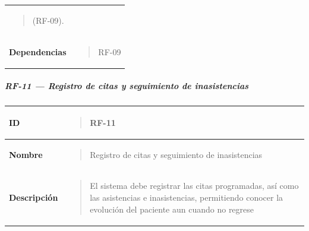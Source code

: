 \documentclass[
]{article}
\newcounter{none} %
\begin{document}
{\begin{longtable}[]{@{}
  >{\raggedright\arraybackslash}p{}
  >{\raggedright\arraybackslash}p{}@{}}
\begin{minipage}[t]{\linewidth}
\begin{quote}
(RF-09).
\end{quote}
\end{minipage} \\
\textbf{Dependencias} & \begin{minipage}[t]{\linewidth}\raggedright
\begin{quote}
RF-09
\end{quote}
\end{minipage} \\
\end{longtable}
}

\subparagraph{RF-11 --- Registro de citas y seguimiento de
inasistencias}\label{rf-11-registro-de-citas-y-seguimiento-de-inasistencias}

{\def\LTcaptype{none} %
\begin{longtable}[]{@{}
  >{\raggedright\arraybackslash}p{}
  >{\raggedright\arraybackslash}p{}@{}}
\toprule\noalign{}
\begin{minipage}[b]{\linewidth}\raggedright
\textbf{ID}
\end{minipage} & \begin{minipage}[b]{\linewidth}\raggedright
\begin{quote}
RF-11
\end{quote}
\end{minipage} \\
\midrule\noalign{}
\endhead
\bottomrule\noalign{}
\endlastfoot
\textbf{Nombre} & \begin{minipage}[t]{\linewidth}\raggedright
\begin{quote}
Registro de citas y seguimiento de inasistencias
\end{quote}
\end{minipage} \\
\textbf{Descripción} & \begin{minipage}[t]{\linewidth}\raggedright
\begin{quote}
El sistema debe registrar las citas programadas, así como las
asistencias e inasistencias, permitiendo conocer la evolución del
paciente aun cuando no regrese


\end{quote}
\end{minipage}
\end{longtable}}
\end{document}
